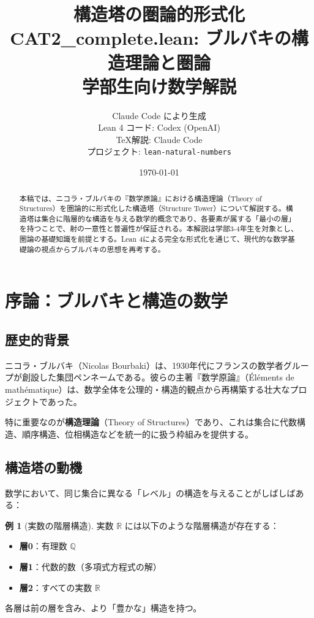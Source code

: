 \documentclass[a4paper,12pt]{ltjsarticle}
\title{構造塔の圏論的形式化\\
  {\large CAT2\_complete.lean: ブルバキの構造理論と圏論}\\
  {\large 学部生向け数学解説}}
\author{Claude Code により生成\\
  {\small Lean 4 コード: Codex (OpenAI)}\\
  {\small \TeX 解説: Claude Code}\\
  {\small プロジェクト: \texttt{lean-natural-numbers}}}
\date{\today}
\theoremstyle{definition}
\newtheorem{example}[theorem]{例}
\newcommand{\R}{\mathbb{R}}
\begin{document}
\maketitle

\begin{abstract}
本稿では、ニコラ・ブルバキの『数学原論』における構造理論（Theory of Structures）を圏論的に形式化した構造塔（Structure Tower）について解説する。構造塔は集合に階層的な構造を与える数学的概念であり、各要素が属する「最小の層」を持つことで、射の一意性と普遍性が保証される。本解説は学部3-4年生を対象とし、圏論の基礎知識を前提とする。Lean 4による完全な形式化を通じて、現代的な数学基礎論の視点からブルバキの思想を再考する。
\end{abstract}

\tableofcontents

\section{序論：ブルバキと構造の数学}

\subsection{歴史的背景}

\begin{historical}
ニコラ・ブルバキ（Nicolas Bourbaki）は、1930年代にフランスの数学者グループが創設した集団ペンネームである。彼らの主著『数学原論』（Éléments de mathématique）は、数学全体を公理的・構造的観点から再構築する壮大なプロジェクトであった。

特に重要なのが\textbf{構造理論}（Theory of Structures）であり、これは集合に代数構造、順序構造、位相構造などを統一的に扱う枠組みを提供する。
\end{historical}

\subsection{構造塔の動機}

数学において、同じ集合に異なる「レベル」の構造を与えることがしばしばある：

\begin{example}[実数の階層構造]
実数 $\R$ には以下のような階層構造が存在する：
\begin{itemize}
\item \textbf{層0}：有理数 $\mathbb{Q}$
\item \textbf{層1}：代数的数（多項式方程式の解）
\item \textbf{層2}：すべての実数 $\R$
\end{itemize}
各層は前の層を含み、より「豊かな」構造を持つ。
\end{example}
\end{document}
